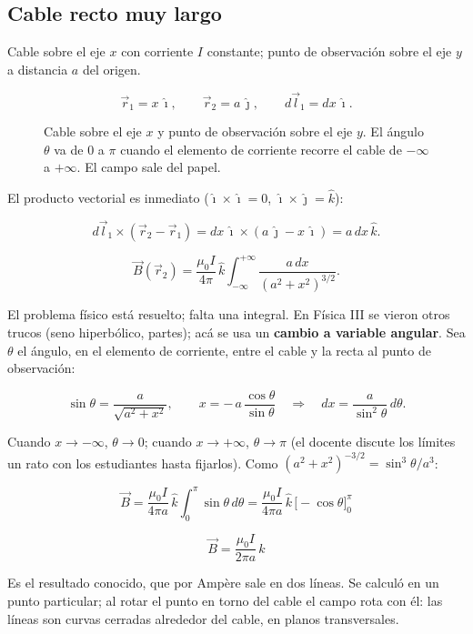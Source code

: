 \documentclass[12pt,a4paper]{article}
\begin{document}
\subsection{Cable recto muy largo}

Cable sobre el eje $x$ con corriente $I$ constante; punto de observación sobre
el eje $y$ a distancia $a$ del origen.

\[
\vec r_1 = x\,\hat\imath,\qquad \vec r_2 = a\,\hat\jmath,\qquad
d\vec l_1 = dx\,\hat\imath .
\]

\begin{figure}[H]
  \centering
  
  \caption{Cable sobre el eje $x$ y punto de observación sobre el eje $y$. El ángulo $\theta$ va de $0$ a $\pi$ cuando el elemento de corriente recorre el cable de $-\infty$ a $+\infty$. El campo sale del papel.}
\end{figure}

El producto vectorial es inmediato ($\hat\imath\times\hat\imath = 0$,
$\hat\imath\times\hat\jmath = \hat k$):

\[
d\vec l_1\times(\vec r_2-\vec r_1) = dx\,\hat\imath\times(a\,\hat\jmath - x\,\hat\imath)
= a\,dx\,\hat k .
\]

\[
\vec B(\vec r_2) = \frac{\mu_0 I}{4\pi}\,\hat k\int_{-\infty}^{+\infty}
\frac{a\,dx}{\left(a^2+x^2\right)^{3/2}} .
\]

El problema físico está resuelto; falta una integral. En Física III se vieron
otros trucos (seno hiperbólico, partes); acá se usa un \textbf{cambio a variable
angular}. Sea $\theta$ el ángulo, en el elemento de corriente, entre el cable
y la recta al punto de observación:

\[
\sin\theta = \frac{a}{\sqrt{a^2+x^2}},
\qquad
x = -\,a\,\frac{\cos\theta}{\sin\theta}
\quad\Longrightarrow\quad
dx = \frac{a}{\sin^2\theta}\,d\theta .
\]

Cuando $x\to-\infty$, $\theta\to0$; cuando $x\to+\infty$, $\theta\to\pi$ (el
docente discute los límites un rato con los estudiantes hasta fijarlos). Como
$\left(a^2+x^2\right)^{-3/2} = \sin^3\theta/a^3$:

\[
\vec B = \frac{\mu_0 I}{4\pi a}\,\hat k\int_0^{\pi}\sin\theta\,d\theta
= \frac{\mu_0 I}{4\pi a}\,\hat k\,\Big[-\cos\theta\Big]_0^{\pi}
\]

\begin{keybox}
\[
\boxed{\ \vec B = \frac{\mu_0 I}{2\pi a}\,\hat k\ }
\]
\end{keybox}

Es el resultado conocido, que por Ampère sale en dos líneas. Se calculó en un
punto particular; al rotar el punto en torno del cable el campo rota con él:
las líneas son curvas cerradas alrededor del cable, en planos transversales.
\end{document}
